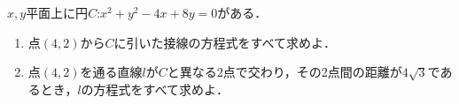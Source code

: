 \documentclass[8pt,dvipdfmx]{article}[b5paper]
\begin{document}
\begin{tcolorbox}[title=数学\textcircled{1} 4-5 ABC]
\(x, y\)平面上に円$C$:\(x^2+y^2-4x+8y=0\)がある．
\begin{enumerate}[(1)]
    \item 点\((4,2)\)から$C$に引いた接線の方程式をすべて求めよ．
    \item 点\((4,2)\)を通る直線$l$が$C$と異なる2点で交わり，その2点間の距離が$4\sqrt{3}$であるとき，$l$の方程式をすべて求めよ．
\end{enumerate}
\end{tcolorbox}
\end{document}
